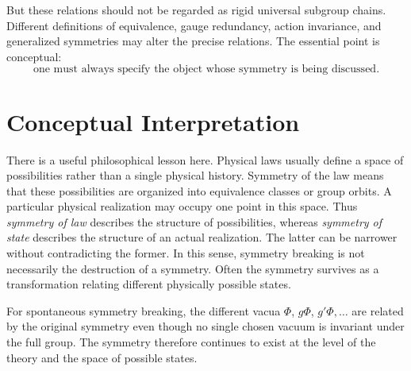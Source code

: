 But these relations should not be regarded as rigid universal subgroup chains.
Different definitions of equivalence, gauge redundancy, action invariance, and
generalized symmetries may alter the precise relations.
The essential point is conceptual:
\[
\boxed{
\text{one must always specify the object whose symmetry is being discussed}.
}
\]

\section{Conceptual Interpretation}
There is a useful philosophical lesson here.
Physical laws usually define a space of possibilities rather than a single
physical history. Symmetry of the law means that these possibilities are
organized into equivalence classes or group orbits. A particular physical
realization may occupy one point in this space.
Thus \emph{symmetry of law} describes the structure of possibilities,
whereas \emph{symmetry of state} 
describes the structure of an actual realization.
The latter can be narrower without contradicting the former.
In this sense, symmetry breaking is not necessarily the destruction of a
symmetry.  Often the symmetry survives as a transformation relating different
physically possible states.

For spontaneous symmetry breaking, the different vacua
$\Phi$, $g\Phi$, $g'\Phi,\ldots$
are related by the original symmetry even though no single chosen vacuum is
invariant under the full group. The symmetry therefore continues to exist at
the level of the theory and the space of possible states.

